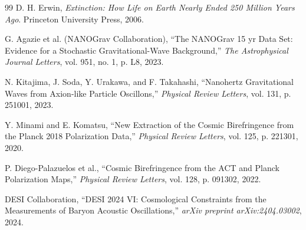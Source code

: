 \documentclass[11pt, twoside]{article}
\begin{document}
\begin{thebibliography}{99}
D. H. Erwin, \textit{Extinction: How Life on Earth Nearly Ended 250 Million Years Ago}. Princeton University Press, 2006.

G. Agazie et al. (NANOGrav Collaboration), ``The NANOGrav 15 yr Data Set: Evidence for a Stochastic Gravitational-Wave Background,'' \textit{The Astrophysical Journal Letters}, vol. 951, no. 1, p. L8, 2023.

N. Kitajima, J. Soda, Y. Urakawa, and F. Takahashi, ``Nanohertz Gravitational Waves from Axion-like Particle Oscillons,'' \textit{Physical Review Letters}, vol. 131, p. 251001, 2023.

Y. Minami and E. Komatsu, ``New Extraction of the Cosmic Birefringence from the Planck 2018 Polarization Data,'' \textit{Physical Review Letters}, vol. 125, p. 221301, 2020.

P. Diego-Palazuelos et al., ``Cosmic Birefringence from the ACT and Planck Polarization Maps,'' \textit{Physical Review Letters}, vol. 128, p. 091302, 2022.

DESI Collaboration, ``DESI 2024 VI: Cosmological Constraints from the Measurements of Baryon Acoustic Oscillations,'' \textit{arXiv preprint arXiv:2404.03002}, 2024.

\end{thebibliography}
\end{document}
